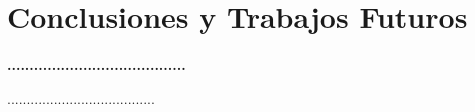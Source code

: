 \section{ Conclusiones y Trabajos Futuros} 
\textbf{........................................}\\
\begin{flushleft}
......................................
\end{flushleft}